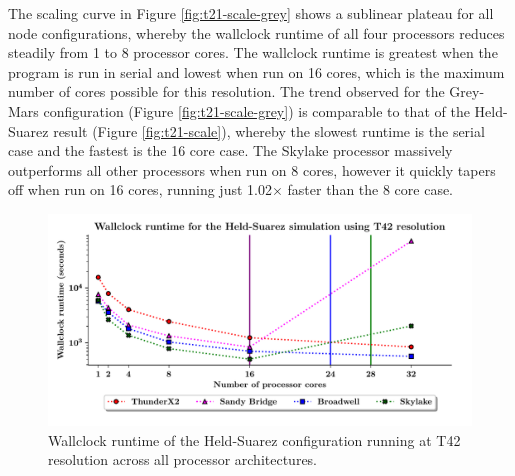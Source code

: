 \documentclass[a4paper,11pt]{report}
\begin{document}
The scaling curve in Figure \ref{fig:t21-scale-grey} shows a sublinear plateau for all node configurations, whereby the wallclock runtime of all four processors reduces steadily from 1 to 8 processor cores. The wallclock runtime is greatest when the program is run in serial and lowest when run on 16 cores, which is the maximum number of cores possible for this resolution. The trend observed for the Grey-Mars configuration (Figure \ref{fig:t21-scale-grey}) is comparable to that of the Held-Suarez result (Figure \ref{fig:t21-scale}), whereby the slowest runtime is the serial case and the fastest is the 16 core case. The Skylake processor massively outperforms all other processors when run on 8 cores, however it quickly tapers off when run on 16 cores, running just 1.02$\times$ faster than the 8 core case.
\par
\begin{figure}[htbp]
\begin{center}
\includegraphics[width=1\textwidth]{img/scaling_graph_T42_Held_suarez.pdf}
\caption[Wallclock runtime of the Held-Suarez configuration running at T42 resolution]{Wallclock runtime of the Held-Suarez configuration running at T42 resolution across all processor architectures.}
\label{fig:t42-scale}
\end{center}
\end{figure}
\end{document}
